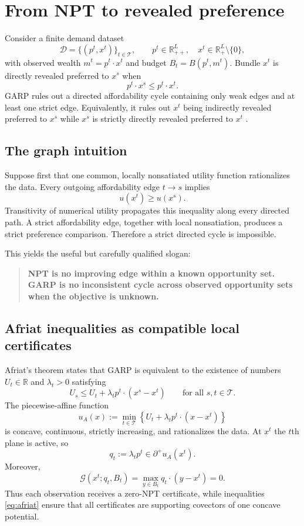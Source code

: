 \documentclass[11pt]{article}
\newcommand{\R}{\mathbb{R}}
\newcommand{\T}{\mathcal{T}}
\newcommand{\cG}{\mathcal{G}}
\theoremstyle{definition}
\theoremstyle{remark}
\begin{document}
\section{From NPT to revealed preference}

Consider a finite demand dataset
\[
  \mathcal D=\{(p^t,x^t)\}_{t\in\T},
  \qquad p^t\in\R_{++}^L,\quad x^t\in\R_+^L\setminus\{0\},
\]
with observed wealth $m^t=p^t\cdot x^t$ and budget $B_t=B(p^t,m^t)$.
Bundle $x^t$ is directly revealed preferred to $x^s$ when
\[
  p^t\cdot x^s\le p^t\cdot x^t.
\]
GARP rules out a directed affordability cycle containing only weak edges and at least one strict
edge.  Equivalently, it rules out $x^t$ being indirectly revealed preferred to $x^s$ while
$x^s$ is strictly directly revealed preferred to $x^t$ \cite{Afriat1967,Varian1982}.

\subsection{The graph intuition}

Suppose first that one common, locally nonsatiated utility function rationalizes the data.  Every
outgoing affordability edge $t\to s$ implies
\[
  u(x^t)\ge u(x^s).
\]
Transitivity of numerical utility propagates this inequality along every directed path.  A strict
affordability edge, together with local nonsatiation, produces a strict preference comparison.
Therefore a strict directed cycle is impossible.

This yields the useful but carefully qualified slogan:
\begin{quote}
\textbf{NPT is no improving edge within a known opportunity set.  GARP is no inconsistent
cycle across observed opportunity sets when the objective is unknown.}
\end{quote}

\subsection{Afriat inequalities as compatible local certificates}

Afriat's theorem states that GARP is equivalent to the existence of numbers $U_t\in\R$ and
$\lambda_t>0$ satisfying
\begin{equation}
  U_s\le U_t+\lambda_t p^t\cdot(x^s-x^t)
  \qquad\text{for all }s,t\in\T.
  \label{eq:afriat}
\end{equation}
The piecewise-affine function
\begin{equation}
  u_A(x):=\min_{t\in\T}
  \left\{U_t+\lambda_t p^t\cdot(x-x^t)\right\}
  \label{eq:afriat-utility}
\end{equation}
is concave, continuous, strictly increasing, and rationalizes the data.  At $x^t$ the $t$th plane is
active, so
\begin{equation}
  q_t:=\lambda_t p^t\in\partial^+u_A(x^t).
  \label{eq:supporting-price}
\end{equation}
Moreover,
\[
  \cG(x^t;q_t,B_t)
  =\max_{y\in B_t}q_t\cdot(y-x^t)
  =0.
\]
Thus each observation receives a zero-NPT certificate, while inequalities
\eqref{eq:afriat} ensure that all certificates are supporting covectors of one concave potential.
\end{document}
